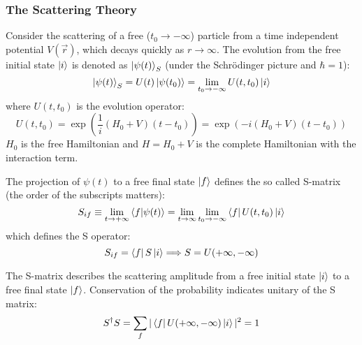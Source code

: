 \subsubsection{The Scattering Theory}
Consider the scattering of a free ($t_0 \rightarrow -\infty$) particle from a 
time independent potential $V(\vec{r})$, 
which decays quickly as $r \rightarrow \infty$. The evolution from the free initial state
$\ket{i}$ is denoted as $\ket{\psi(t)}_S$ (under the Schr\"odinger picture and $\hbar = 1$):
\begin{equation}
    \ket{\psi(t)}_S = U(t)\ket{\psi(t_0)} = \lim_{t_0 \rightarrow -\infty}U(t, t_0)\ket{i}
\end{equation}
where $U(t, t_0)$ is the evolution operator:
\begin{equation}
    U(t, t_0) = \exp(\frac{1}{i}(H_0 + V)(t - t_0)) = \exp(-i(H_0 + V)(t-t_0))
\end{equation}
$H_0$ is the free Hamiltonian and $H = H_0 + V$ is the complete Hamiltonian
with the interaction term. 

The projection of $\psi(t)$ to a free final state $\ket{f}$ defines the so called
S-matrix (the order of the subscripts matters):
\begin{equation}
    S_{if} \equiv \lim_{t\rightarrow +\infty}\bra{f}\ket{\psi(t)} 
    = \lim_{t\rightarrow\infty} \lim_{t_0 \rightarrow -\infty} \bra{f} U(t, t_0) \ket{i}
\end{equation}
which defines the S operator:
\begin{equation}
    S_{if} = \bra{f} S \ket{i} \Longrightarrow S = U(+\infty, -\infty)
\end{equation}

The S-matrix describes the scattering amplitude from a free initial state $\ket{i}$
to a free final state $\ket{f}$. Conservation of the probability indicates
unitary of the S matrix:
\begin{equation}
    S^\dag S = \sum_f |\bra{f} U(+\infty, -\infty) \ket{i}|^2 = 1
\end{equation}

